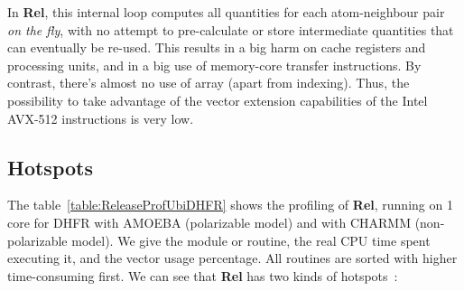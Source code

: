 \documentclass[9pt,comparison]{livecoms}
\begin{document}
In \textbf{Rel}, this internal loop computes all quantities for each atom-neighbour pair \emph{on the fly}, with no attempt to pre-calculate or store intermediate quantities that can eventually be re-used. This results in a big harm on cache registers and processing units, and in a big use of memory-core transfer instructions. By contrast, there's almost no use of array (apart from indexing). Thus, the possibility to take advantage of the vector extension capabilities of the Intel AVX-512 instructions is very low. 
\subsection{Hotspots}
\hspace{\parindent}The table~\ref{table:ReleaseProfUbiDHFR} shows the profiling of \textbf{Rel}, running on 1 core for DHFR with AMOEBA (polarizable model) and with CHARMM (non-polarizable model). We give the module or routine, the real CPU time spent executing it, and the vector usage percentage. All routines are sorted with higher time-consuming first.  We can see that \textbf{Rel} has two kinds of hotspots~:
\end{document}
